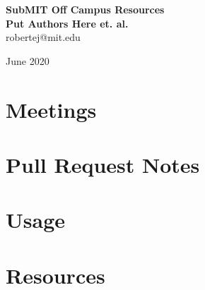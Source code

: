\documentclass[oneside]{book}
\begin{document}
\begin{titlepage}
\begin{center}
 {\huge\bfseries SubMIT Off Campus Resources\\}
 \vspace{1.5cm}
 {\Large\bfseries Put Authors Here et. al.}\\[5pt]
 robertej@mit.edu\\[14pt]
 \vspace{2cm}


 \vfill

 \vfill
{June 2020}
\end{center}
\end{titlepage}

\tableofcontents

\chapter{Meetings}
    
    
%    
    
%        

\chapter{Pull Request Notes}
    

\chapter{Usage}
    
    
\chapter{Resources}
    
    
    
\end{document}
